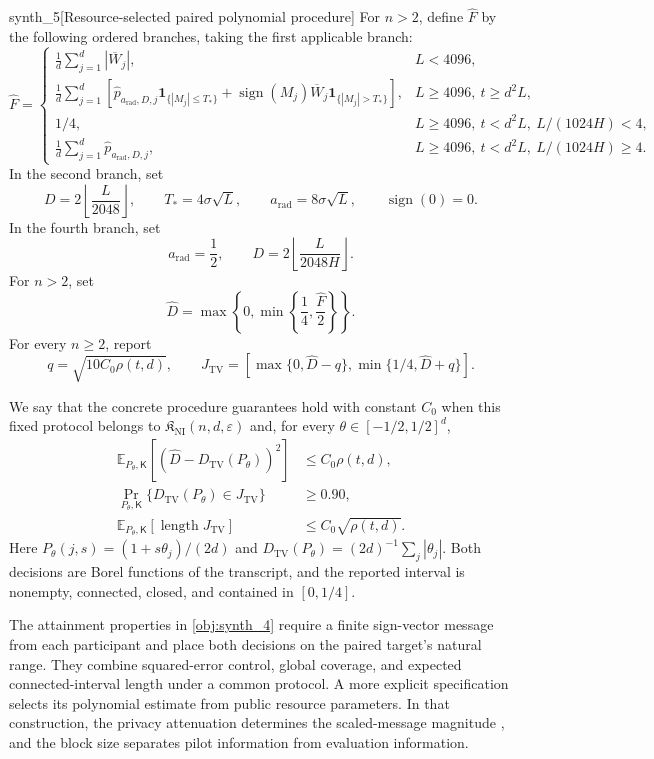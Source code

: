 \documentclass[11pt]{article}
\begin{document}
\begin{definitionv}{synth_5}[Resource-selected paired polynomial procedure]
For \(n>2\), define \(\widehat F\) by the following ordered branches, taking the first applicable branch:
\[
\widehat F=
\begin{cases}
\displaystyle\frac1d\sum_{j=1}^d|\overline W_j|,
&L<4096,\\[6pt]
\displaystyle\frac1d\sum_{j=1}^d
\left[
\widehat p_{a_{\mathrm{rad}},D,j}
\mathbf1_{\{|M_j|\le T_*\}}
+\operatorname{sign}(M_j)\overline W_j
\mathbf1_{\{|M_j|>T_*\}}
\right],
&L\ge4096,\ t\ge d^2L,\\[6pt]
1/4,
&L\ge4096,\ t<d^2L,\ L/(1024H)<4,\\[4pt]
\displaystyle\frac1d\sum_{j=1}^d
\widehat p_{a_{\mathrm{rad}},D,j},
&L\ge4096,\ t<d^2L,\ L/(1024H)\ge4.
\end{cases}
\]
In the second branch, set
\[
D=2\left\lfloor\frac{L}{2048}\right\rfloor,
\qquad T_*=4\sigma\sqrt L,\qquad
a_{\mathrm{rad}}=8\sigma\sqrt L,
\qquad \operatorname{sign}(0)=0.
\]
In the fourth branch, set
\[
a_{\mathrm{rad}}=\frac12,
\qquad D=2\left\lfloor\frac{L}{2048H}\right\rfloor.
\]
For \(n>2\), set
\[
\widehat D=\max\left\{0,\min\left\{\frac14,\frac{\widehat F}{2}\right\}\right\}.
\]
For every \(n\ge2\), report
\[
q=\sqrt{10C_0\rho(t,d)},\qquad
J_{\mathrm{TV}}
=\left[
\max\{0,\widehat D-q\},
\min\{1/4,\widehat D+q\}
\right].
\]

We say that the concrete procedure guarantees hold with constant \(C_0\) when this fixed protocol belongs to \(\mathfrak K_{\mathrm{NI}}(n,d,\varepsilon)\) and, for every \(\theta\in[-1/2,1/2]^d\),
\[
\begin{aligned}
\mathbb E_{P_\theta,\mathsf K}
\left[(\widehat D-D_{\mathrm{TV}}(P_\theta))^2\right]
&\le C_0\rho(t,d),\\
\Pr_{P_\theta,\mathsf K}
\{D_{\mathrm{TV}}(P_\theta)\in J_{\mathrm{TV}}\}
&\ge0.90,\\
\mathbb E_{P_\theta,\mathsf K}
\left[\operatorname{length}J_{\mathrm{TV}}\right]
&\le C_0\sqrt{\rho(t,d)}.
\end{aligned}
\]
Here \(P_\theta(j,s)=(1+s\theta_j)/(2d)\) and
\(D_{\mathrm{TV}}(P_\theta)=(2d)^{-1}\sum_j|\theta_j|\).
Both decisions are Borel functions of the transcript, and the reported interval is nonempty, connected, closed, and contained in \([0,1/4]\).
\end{definitionv}

The attainment properties in \cref{obj:synth_4} require a finite sign-vector message from each participant and place both decisions on the paired target's natural range. They combine squared-error control, global coverage, and expected connected-interval length under a common protocol. A more explicit specification selects its polynomial estimate from public resource parameters. In that construction, the privacy attenuation  determines the scaled-message magnitude , and the block size  separates pilot information from evaluation information.
\end{document}
